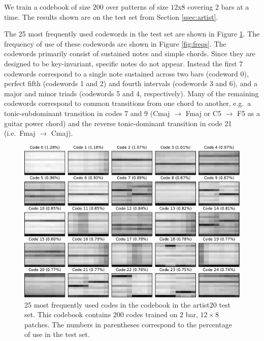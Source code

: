 \documentclass{article}
\newcommand{\ie}{i.e.~}
\newcommand{\eg}{e.g.~}
\begin{document}
We train a codebook of size $200$ over patterns of size $12$x$8$ covering
$2$ bars at a time.  The results shown are on the test set from
Section \ref{ssec:artist}.


The 25 most frequently used codewords in the test set are shown in
Figure \ref{fig:codes1}.  
The frequency of use of these codewords are shown in Figure \ref{fig:freqs}.
The codewords primarily consist of sustained
notes and simple chords.  Since they are designed to be key-invariant,
specific notes do not appear.  Instead the first 7 codewords
correspond to a single note sustained across two bars (codeword 0),
perfect fifth (codewords 1 and 2) and fourth intervals (codewords 3
and 6), and a
major and minor triads (codewords 5 and 4, respectively).  Many of the remaining
codewords correspond to common transitions from one chord to another,
\eg a tonic-subdominant transition in codes 7 and 9
(Cmaj
$\rightarrow$ Fmaj or C5 $\rightarrow$ F5 as a guitar power chord)
and the reverse tonic-dominant transition in code 21 (\ie Fmaj
$\rightarrow$ Cmaj).

\begin{figure}[h]
\begin{center}
\includegraphics[width=.9\columnwidth]{codes1}
\end{center}
\caption{\small{
25 most frequently used codes in the codebook %
in the artist20 test set. 
This codebook contains $200$ codes trained on $2$ bar, $12 \times 8$
patches.
The numbers 
in parentheses correspond to 
the percentage of use in the test set.
}}
\label{fig:codes1}
\end{figure}
\end{document}

